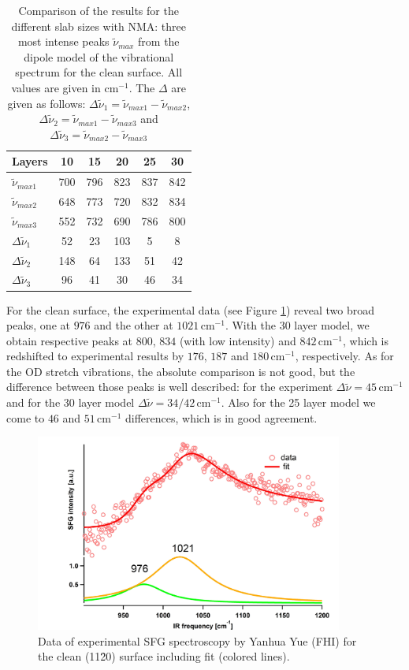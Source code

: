 \documentclass[11pt,DIV=13,BCOR=5mm,a4paper,headinclude]{scrbook}
\begin{document}
\begin{table}[!h]
  \centering
 \caption{Comparison of the results for the different slab sizes with NMA: three most intense peaks $\tilde{\nu}_{max}$ from the dipole model of the vibrational spectrum for the clean surface.
 All values are given in cm$^{-1}$.
 The $\Delta$ are given as follows: $\Delta\tilde{\nu}_1=\tilde{\nu}_{max1}-\tilde{\nu}_{max2}$, $\Delta\tilde{\nu}_2=\tilde{\nu}_{max1}-\tilde{\nu}_{max3}$ and $\Delta\tilde{\nu}_3=\tilde{\nu}_{max2}-\tilde{\nu}_{max3}$}
\vspace*{.2cm} 
  \begin{tabular}{l|ccccc}
  \toprule
Layers& 10&15&20&25&30 \\\midrule
$\tilde{\nu}_{max1}$ &700 &796& 823&837 & 842\\
$\tilde{\nu}_{max2}$&648 &773 &720 &832 &834\\
$\tilde{\nu}_{max3}$&552 &732 &690 &786 &800\\\midrule
$\Delta\tilde{\nu}_1$&52 &23 &103 &5 &8 \\
$\Delta\tilde{\nu}_2$&148 &64 &133 &51 &42 \\
$\Delta\tilde{\nu}_3$&96 &41 &30 &46 &34 \\\bottomrule
  \end{tabular}
  \label{tab:comp_norm-modes_clean}
\end{table}


For the clean surface, the experimental data (see Figure \ref{abb:exp-sfg_clean}) reveal two broad peaks, one at $976$ and the other at $1021\,$cm$^{-1}$.
With the 30 layer model, we obtain respective peaks at $800$, $834$ (with low intensity) and $842\,$cm$^{-1}$, which is redshifted to experimental results by $176$, $187$ and $180\,$cm$^{-1}$, respectively.
As for the OD stretch vibrations, the absolute comparison is not good, but the difference between those peaks is well described: for the experiment $\Delta \tilde{\nu}=45\,$cm$^{-1}$ and for the 30 layer model $\Delta \tilde{\nu}=34/42\,$cm$^{-1}$.
Also for the 25 layer model we come to $46$ and $51\,$cm$^{-1}$ differences, which is in good agreement.
\begin{figure}[!ht]
 \centering
\includegraphics[width=0.9\textwidth]{figures/11-20/ssp_UHV_800K_fit_clean.jpg}
 \caption{Data of experimental SFG spectroscopy by Yanhua Yue (FHI) for the clean (11\=20) surface including fit (colored lines).}
        \label{abb:exp-sfg_clean}
 \end{figure}
\end{document}
